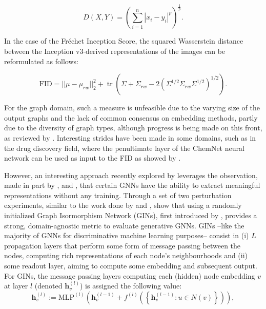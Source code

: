 \begin{equation}
  \label{eq:minkoski}
  D\left(X,Y\right)=\left(\sum _{i=1}^{n}|x_{i}-y_{i}|^{p}\right)^{\frac {1}{p}}.
\end{equation}

In the case of the Fr\'echet Inception Score, the squared Wasserstein distance
between the Inception v3-derived representations of the images can be
reformulated as follows:

\begin{equation}
  \label{eq:fid}
  \text{FID}=||\mu -\mu _{rw}||_{2}^{2}+\operatorname {tr} (\Sigma +\Sigma
_{rw}-2(\Sigma ^{1/2}\Sigma _{rw}\Sigma ^{1/2})^{1/2}).
\end{equation}

For the graph domain, such a measure is unfeasible due to the varying size of
the output graphs and the lack of common consensus on embedding methods, partly
due to the diversity of graph types, although progress is being made on this
front, as reviewed by \citet{xu2021understanding}. Interesting strides have been
made in some domains, such as in the drug discovery field, where the penultimate
layer of the ChemNet neural network can be used as input to the FID as showed by
\citet{preuer2018frechet}.

However, an interesting approach recently explored by
\citet{thompson2022evaluation} leverages the observation, made in part by
\cite{xu2018powerful,morris2019weisfeiler}, and \cite{kipf2016semi}, that
certain GNNs have the ability to extract meaningful
representations without any training. Through a set of two perturbation
experiments, similar to the work done by \citet{xu2018empirical} and
\citet{o2021evaluation}, \citet{thompson2022evaluation} show that using a
randomly initialized Graph Isormorphism Network (GINs), first introduced by
\cite{xu2018powerful}, provides a strong, domain-agnostic metric to evaluate
generative GNNs. GINs --like the majority of GNNs for discriminative machine
learning purposes-- consist in (i) $L$ propagation layers that perform some form
of message passing between the nodes, computing rich representations of each
node's neighbourhoods and (ii) some readout layer, aiming to compute some
embedding and subsequent output. For GINs, the message passing layers computing
each (hidden) node embedding $v$ at layer $l$ (denoted $\mathbf{h}_{v}^{(l)}$)
is assigned the following value:
\begin{equation}
  \label{eq:mplgin}
  \mathbf{h}_{v}^{(l)}:=\text{MLP}^{(l)}\left(\mathbf{h}_{v}^{(l-1)} +
f^{(l)}\left(\left\{ \mathbf{h}_{v}^{(l-1)}: u\in N(v)\right\}\right)\right),
\end{equation}

